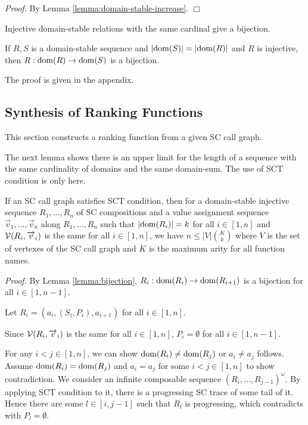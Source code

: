 {\em Proof.}
By Lemma \ref{lemma:domain-stable-increase}.
$\Box$

Injective domain-stable relations with the same cardinal give a bijection.

\begin{Lemma}\label{lemma:bijection}
If $R,S$ is a domain-stable sequence
and $|{\rm dom}(S)|=|{\rm dom}(R)|$
and $R$ is injective,
then $R:{\rm dom}(R) \to {\rm dom}(S)$ is a bijection.
\end{Lemma}

The proof is given in the appendix.

\subsection{Synthesis of Ranking Functions}

This section constructs a ranking function from a given SC call graph.

The next lemma shows
there is an upper limit for the length
of a sequence with the same cardinality of domains
and the same domain-sum.
The use of SCT condition is only here.

\begin{Lemma}\label{lemma:maxlen}
If an SC call graph satisfies SCT condition,
then
for a domain-stable injective sequence $R_1,\ldots, R_n$ of SC compositions
and a value assignment sequence 
$\Vec v_1,\ldots,\Vec v_n$ along $R_1,\ldots, R_n$
such that $|{\rm dom}(R_i)|=k$ for all $i \in [1,n]$ and
${{\mathcal V}}(R_i,\overrightarrow v_i)$ is the same for all $i \in [1,n]$,
we have
$n \le |V|{K \choose k}$
where $V$ is the set of vertexes of the SC call graph and
$K$ is the maximum arity for all function names.
\end{Lemma}

{\em Proof.}
By Lemma \ref{lemma:bijection},
$R_i:{\rm dom}(R_i) \to {\rm dom}(R_{i+1})$ is a bijection for all $i \in [1,n-1]$.

Let $R_i=(a_i,(S_i,P_i),a_{i+1})$ for all $i \in [1,n]$.

Since ${{\mathcal V}}(R_i,\overrightarrow v_i)$ is the same for all $i \in [1,n]$,
$P_i = \emptyset$ for all $i \in [1,n-1]$.

For any $i <j \in [1,n]$, we can show 
${\rm dom}(R_i) \ne {\rm dom}(R_j)$ or $a_i \ne a_j$ follows.
Assume ${\rm dom}(R_i) = {\rm dom}(R_j)$ and $a_i = a_j$
for some $i < j \in [1,n]$ to show contradiction.
We consider an infinite composable sequence $(R_i,\ldots,R_{j-1})^\omega$.
By applying SCT condition to it,
there is a progressing SC trace of some tail of it.
Hence
there are some $l \in [i,j-1]$ such that $R_l$ 
is progressing, which contradicts
with $P_l = \emptyset$.

